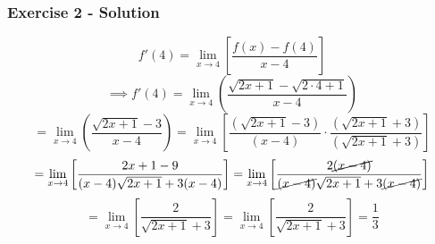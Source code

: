 \documentclass[12pt]{beamer}
\begin{document}
\begin{frame}
	\frametitle{Exercise 2 - Solution}

	\large
	\[f'(4)=\displaystyle\lim_{x\to4}\left[\frac{f(x)-f(4)}{x-4}\right]\]
	\vfill
	\small
	\[\implies f'(4)=\displaystyle\lim_{x\to4}\left(\frac{\sqrt{2x+1}-\sqrt{2\cdot4+1}}{x-4}\right)\]
	\[=\displaystyle\lim_{x\to4}\left(\frac{\sqrt{2x+1}-3}{x-4}\right)=\displaystyle\lim_{x\to4}\left[\frac{(\sqrt{2x+1}-3)}{(x-4)}\cdot \frac{(\sqrt{2x+1}+3)}{(\sqrt{2x+1}+3)}\right]\]
	\tiny
	\[=\displaystyle\lim_{x\to4}\left[\frac{2x+1-9}{(x-4)\sqrt{2x+1}+3(x-4)}\right]=\displaystyle\lim_{x\to4}\left[\frac{2\cancel{(x-4)}}{\cancel{(x-4)}\sqrt{2x+1}+3\cancel{(x-4)}}\right]\]
	\small
	\[=\displaystyle\lim_{x\to4}\left[\frac{2}{\sqrt{2x+1}+3}\right]=\displaystyle\lim_{x\to4}\left[\frac{2}{\sqrt{2x+1}+3}\right]=\boxed{\frac{1}{3}}\]
	\vfill
\end{frame}
\end{document}
